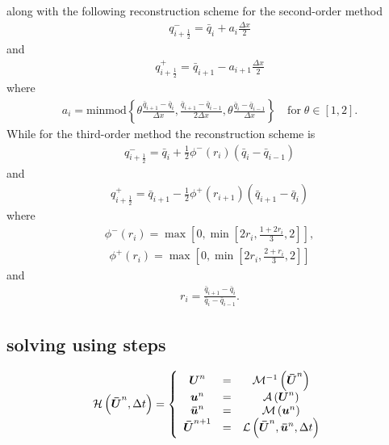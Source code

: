 \documentclass[12pt]{article}
\begin{document}
along with the following reconstruction scheme for the second-order method
\begin{gather*}
q^-_{i + \frac{1}{2}} =  \bar{q}_i + a_i \frac{\Delta x}{2}
\end{gather*}
and
\begin{gather*}
q^+_{i + \frac{1}{2}} =  \bar{q}_{i+1} - a_{i + 1} \frac{\Delta x}{2}
\end{gather*}
where
\begin{gather*}
a_i = \text{minmod}\left\lbrace\theta \frac{\bar{q}_{i+1} - \bar{q}_{i}}{\Delta x}, \frac{\bar{q}_{i+1} - \bar{q}_{i-1}}{2\Delta x} ,\theta \frac{\bar{q}_{i} - \bar{q}_{i-1}}{\Delta x}\right\rbrace \quad \text{for} \; \theta \in \left[1,2\right].
\end{gather*}
While for the third-order method the reconstruction scheme is
\begin{gather*}
q^-_{i + \frac{1}{2}} = \bar{q}_i + \frac{1}{2}\phi^-\left(r_i\right)\left(\bar{q}_i -\bar{q}_{i-1} \right)
\end{gather*}
and
\begin{gather*}
q^+_{i + \frac{1}{2}} = \bar{q}_{i+1} - \frac{1}{2}\phi^+\left(r_{i+1}\right)\left(\bar{q}_{i+1} -\bar{q}_{i} \right)
\end{gather*}
where
\begin{gather*}
\phi^-\left(r_i\right) = \max\left[0, \min\left[2 r_i, \frac{1 + 2r_i}{3},2\right]\right],
\end{gather*}
\begin{gather*}
\phi^+\left(r_i\right) = \max\left[0, \min\left[2 r_i, \frac{2 + r_i}{3},2\right]\right]
\end{gather*}
and
\begin{gather*}
r_i = \frac{\bar{q}_{i+1} - \bar{q}_{i} }{\bar{q}_{i} - \bar{q}_{i-1}}.
\end{gather*}

\subsection{solving using steps}


\begin{gather}
\mathcal{H}\left(\boldsymbol{\bar{U}}^n,\Delta t \right) = \left\lbrace 
\begin{array}{c c c} 
	\boldsymbol{U}^n &=& \mathcal{M}^{-1}\left(\boldsymbol{\bar{U}}^n\right) \\
	\boldsymbol{u}^n &=& \mathcal{A}\left(\boldsymbol{U}^n\right) \\
	\boldsymbol{\bar{u}}^n &=&  \mathcal{M}\left(\boldsymbol{u}^n\right) \\
	\boldsymbol{\bar{U}}^{n+1} &=& \mathcal{L}\left(\boldsymbol{\bar{U}}^{n},\boldsymbol{\bar{u}}^n,\Delta t\right)							
\end{array} \right.
\end{gather}
\end{document}
